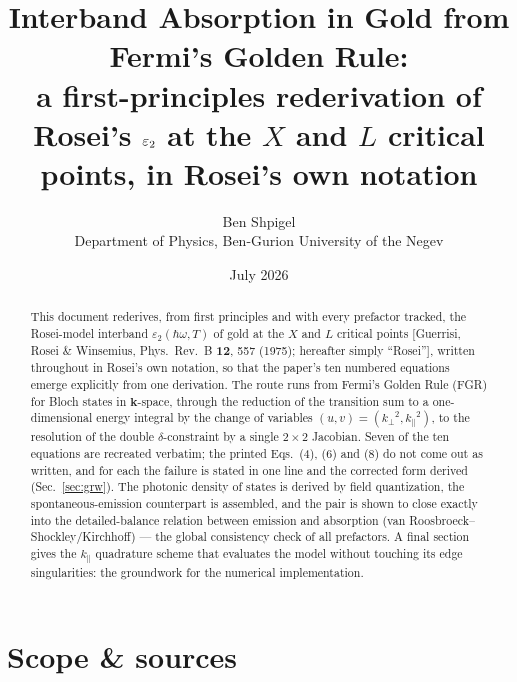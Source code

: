 \documentclass[11pt,a4paper]{article}
\title{\bfseries Interband Absorption in Gold from Fermi's Golden Rule:\\
a first-principles rederivation of Rosei's $\varepsilon_2$ at the $X$ and $L$
critical points, in Rosei's own notation}
\author{Ben Shpigel\\ \small Department of Physics, Ben-Gurion University of the Negev}
\date{July 2026}
\numberwithin{equation}{section}
\begin{document}
\maketitle

\begin{abstract}
\noindent
This document rederives, from first principles and with every prefactor
tracked, the Rosei-model interband ${\varepsilon}_2({\hbar\omega},T)$ of gold at the $X$
and $L$ critical points [Guerrisi, Rosei \& Winsemius, Phys.\ Rev.\ B
\textbf{12}, 557 (1975); hereafter simply ``Rosei''], written
throughout in Rosei's own notation, so that the paper's ten numbered
equations emerge explicitly from one derivation.  The route runs from
Fermi's Golden Rule (FGR) for Bloch states in $\mathbf{k}$-space,
through the reduction of the transition sum to a one-dimensional
energy integral by the change of variables $(u,v)=({k_{\perp}}^2,{k_{\parallel}}^2)$,
to the resolution of the double $\delta$-constraint by a single
$2\times2$ Jacobian.  Seven of the ten equations are recreated
verbatim; the printed Eqs.~(4), (6) and (8) do not come out as
written, and for each the failure is stated in one line and the
corrected form derived (Sec.~\ref{sec:grw}).  The photonic density of
states is derived by field quantization, the spontaneous-emission
counterpart is assembled, and the pair is shown to close exactly into
the detailed-balance relation between emission and absorption (van
Roosbroeck--Shockley/Kirchhoff) --- the global consistency check of
all prefactors.  A final section gives the ${k_{\parallel}}$ quadrature scheme
that evaluates the model without touching its edge singularities: the
groundwork for the numerical implementation.
\end{abstract}
\tableofcontents

\section{Scope \& sources}\label{sec:scope}
\end{document}
